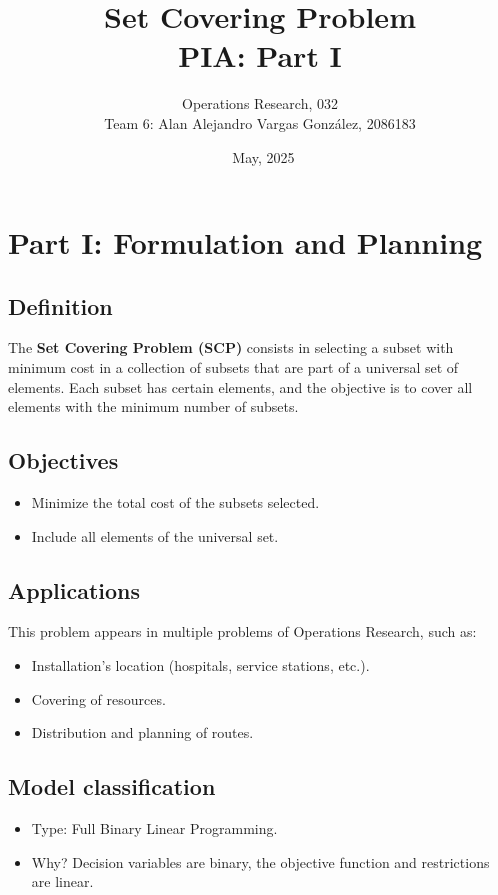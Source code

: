 \documentclass[12pt]{article}
\title{Set Covering Problem\\\large PIA: Part I}
\author{Operations Research, 032\\\large Team 6: Alan Alejandro Vargas González, 2086183}
\date{\ May, 2025}
\begin{document}
\maketitle

\section{Part I: Formulation and Planning}

\subsection{Definition}
The \textbf{Set Covering Problem (SCP)} consists in selecting a subset with minimum cost in a collection of subsets that are part of a universal set of elements. Each subset has certain elements, and the objective is to cover all elements with the minimum number of subsets.

\subsection{Objectives}
\begin{itemize}
    \item Minimize the total cost of the subsets selected.
    \item Include all elements of the universal set.
\end{itemize}

\subsection{Applications}
This problem appears in multiple problems of Operations Research, such as:
\begin{itemize}
    \item Installation's location (hospitals, service stations, etc.).
    \item Covering of resources.
    \item Distribution and planning of routes.
\end{itemize}

\subsection{Model classification}
\begin{itemize}
    \item Type: Full Binary Linear Programming.
    \item Why? Decision variables are binary, the objective function and restrictions are linear.   
\end{itemize}
\end{document}
